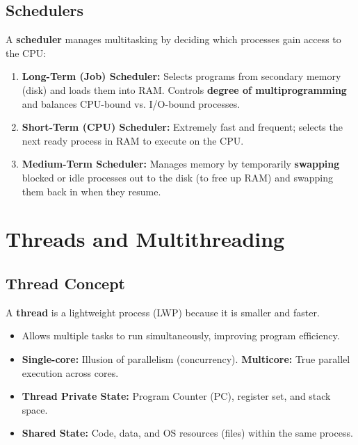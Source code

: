 \documentclass[10pt,a4paper]{article}
\begin{document}
\subsection{Schedulers}
A \textbf{scheduler} manages multitasking by deciding which processes gain access to the CPU:
\begin{enumerate}
    \item \textbf{Long-Term (Job) Scheduler:} Selects programs from secondary memory (disk) and loads them into RAM. Controls \textbf{degree of multiprogramming} and balances CPU-bound vs. I/O-bound processes.
    \item \textbf{Short-Term (CPU) Scheduler:} Extremely fast and frequent; selects the next ready process in RAM to execute on the CPU.
    \item \textbf{Medium-Term Scheduler:} Manages memory by temporarily \textbf{swapping} blocked or idle processes out to the disk (to free up RAM) and swapping them back in when they resume.
\end{enumerate}

\clearpage
\section{Threads and Multithreading}

\subsection{Thread Concept}
A \textbf{thread} is a lightweight process (LWP) because it is smaller and faster.
\begin{itemize}
    \item Allows multiple tasks to run simultaneously, improving program efficiency.
    \item \textbf{Single-core:} Illusion of parallelism (concurrency). \textbf{Multicore:} True parallel execution across cores.
    \item \textbf{Thread Private State:} Program Counter (PC), register set, and stack space.
    \item \textbf{Shared State:} Code, data, and OS resources (files) within the same process.
\end{itemize}
\end{document}
